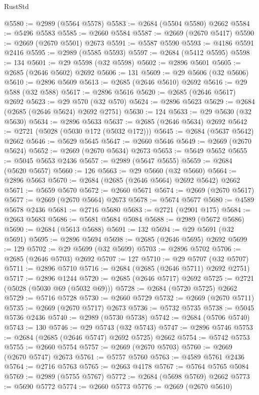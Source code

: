 \begin{lexlean}{RustStd}
\begin{coremodule}
@5580 := @2989 (@5564 @5578)
@5583 := @2684 (@5504 @5580) @2662
@5584 := @5496 @5583
@5585 := @2660 @5584
@5587 := @2669 (@2670 @5417)
@5590 := @2669 (@2670 @5501) @2673
@5591 := @5587 @5590
@5593 := @4186 @5591 @2416
@5595 := @2989 (@5585 @5593)
@5597 := @2684 (@5412 @5595)
@5598 := 134
@5601 := @29 @5598 (@32 @5598)
@5602 := @2896 @5601
@5605 := @2685 (@2646 @5602) @2692
@5606 := 131
@5609 := @29 @5606 (@32 @5606)
@5610 := @2896 @5609
@5613 := @2685 (@2646 @5610) @2692
@5616 := @29 @588 (@32 @588)
@5617 := @2896 @5616
@5620 := @2685 (@2646 @5617) @2692
@5623 := @29 @570 (@32 @570)
@5624 := @2896 @5623
@5629 := @2684 (@2685 (@2646 @5624) @2692 @2751)
@5630 := 124
@5633 := @29 @5630 (@32 @5630)
@5634 := @2896 @5633
@5637 := @2685 (@2646 @5634) @2692
@5642 := @2721 (@5028 (@5030 @172 (@5032 @172)))
@5645 := @2684 (@5637 @5642) @2662
@5646 := @5629 @5645
@5647 := @2660 @5646
@5649 := @2669 (@2670 @5624)
@5652 := @2669 (@2670 @5634) @2673
@5653 := @5649 @5652
@5655 := @5045 @5653 @2436
@5657 := @2989 (@5647 @5655)
@5659 := @2684 (@5620 @5657)
@5660 := 126
@5663 := @29 @5660 (@32 @5660)
@5664 := @2896 @5663
@5670 := @2684 (@2685 (@2646 @5664) @2692 @5642) @2662
@5671 := @5659 @5670
@5672 := @2660 @5671
@5674 := @2669 (@2670 @5617)
@5677 := @2669 (@2670 @5664) @2673
@5678 := @5674 @5677
@5680 := @4589 @5678 @2436
@5681 := @2716 @5680
@5683 := @2721 (@2901 @175)
@5684 := @2663 @5683
@5686 := @5681 @5684 @5084
@5688 := @2989 (@5672 @5686)
@5690 := @2684 (@5613 @5688)
@5691 := 132
@5694 := @29 @5691 (@32 @5691)
@5695 := @2896 @5694
@5698 := @2685 (@2646 @5695) @2692
@5699 := 129
@5702 := @29 @5699 (@32 @5699)
@5703 := @2896 @5702
@5706 := @2685 (@2646 @5703) @2692
@5707 := 127
@5710 := @29 @5707 (@32 @5707)
@5711 := @2896 @5710
@5716 := @2684 (@2685 (@2646 @5711) @2692 @2751)
@5717 := @2896 @1244
@5720 := @2685 (@2646 @5717) @2692
@5725 := @2721 (@5028 (@5030 @69 (@5032 @69)))
@5728 := @2684 (@5720 @5725) @2662
@5729 := @5716 @5728
@5730 := @2660 @5729
@5732 := @2669 (@2670 @5711)
@5735 := @2669 (@2670 @5717) @2673
@5736 := @5732 @5735
@5738 := @5045 @5736 @2436
@5740 := @2989 (@5730 @5738)
@5742 := @2684 (@5706 @5740)
@5743 := 130
@5746 := @29 @5743 (@32 @5743)
@5747 := @2896 @5746
@5753 := @2684 (@2685 (@2646 @5747) @2692 @5725) @2662
@5754 := @5742 @5753
@5755 := @2660 @5754
@5757 := @2669 (@2670 @5703)
@5760 := @2669 (@2670 @5747) @2673
@5761 := @5757 @5760
@5763 := @4589 @5761 @2436
@5764 := @2716 @5763
@5765 := @2663 @4178
@5767 := @5764 @5765 @5084
@5769 := @2989 (@5755 @5767)
@5772 := @2684 (@5698 @5769) @2662
@5773 := @5690 @5772
@5774 := @2660 @5773
@5776 := @2669 (@2670 @5610)

\end{coremodule}
\end{lexlean}
